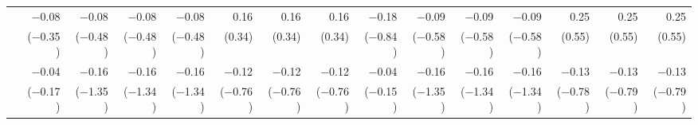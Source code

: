 \begin{tabularx}{1.45\textwidth}{lRRRRRRRRRRRRRR}
		 & \num{-0.08}\phantom{***)} & \num{-0.08}\phantom{***)} & \num{-0.08}\phantom{***)} & \num{-0.08}\phantom{***)} & \num{0.16}\phantom{***)} & \num{0.16}\phantom{***)} & \num{0.16}\phantom{***)} & \num{-0.18}\phantom{***)} & \num{-0.09}\phantom{***)} & \num{-0.09}\phantom{***)} & \num{-0.09}\phantom{***)} & \num{0.25}\phantom{***)} & \num{0.25}\phantom{***)} & \num{0.25}\phantom{***)} \\
		 & (\num{-0.35})\phantom{***} & (\num{-0.48})\phantom{***} & (\num{-0.48})\phantom{***} & (\num{-0.48})\phantom{***} & (\num{0.34})\phantom{***} & (\num{0.34})\phantom{***} & (\num{0.34})\phantom{***} & (\num{-0.84})\phantom{***} & (\num{-0.58})\phantom{***} & (\num{-0.58})\phantom{***} & (\num{-0.58})\phantom{***} & (\num{0.55})\phantom{***} & (\num{0.55})\phantom{***} & (\num{0.55})\phantom{***} \\ [\dspacing]
		 & \num{-0.04}\phantom{***)} & \num{-0.16}\phantom{***)} & \num{-0.16}\phantom{***)} & \num{-0.16}\phantom{***)} & \num{-0.12}\phantom{***)} & \num{-0.12}\phantom{***)} & \num{-0.12}\phantom{***)} & \num{-0.04}\phantom{***)} & \num{-0.16}\phantom{***)} & \num{-0.16}\phantom{***)} & \num{-0.16}\phantom{***)} & \num{-0.13}\phantom{***)} & \num{-0.13}\phantom{***)} & \num{-0.13}\phantom{***)} \\
		 & (\num{-0.17})\phantom{***} & (\num{-1.35})\phantom{***} & (\num{-1.34})\phantom{***} & (\num{-1.34})\phantom{***} & (\num{-0.76})\phantom{***} & (\num{-0.76})\phantom{***} & (\num{-0.76})\phantom{***} & (\num{-0.15})\phantom{***} & (\num{-1.35})\phantom{***} & (\num{-1.34})\phantom{***} & (\num{-1.34})\phantom{***} & (\num{-0.78})\phantom{***} & (\num{-0.79})\phantom{***} & (\num{-0.79})\phantom{***} \\ [\dspacing]
        \bottomrule
    \end{tabularx}%